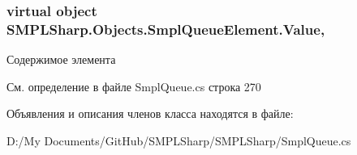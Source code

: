 \hypertarget{class_s_m_p_l_sharp_1_1_objects_1_1_smpl_queue_element_aa16777046bf5b47815ff3c8ccab88407}{
\subsubsection[{Value}]{\setlength{\rightskip}{0pt plus 5cm}virtual object S\-M\-P\-L\-Sharp.\-Objects.\-Smpl\-Queue\-Element.\-Value\hspace{0.3cm}{\ttfamily [get]}, {\ttfamily [set]}}}\label{d3/d48/class_s_m_p_l_sharp_1_1_objects_1_1_smpl_queue_element_aa16777046bf5b47815ff3c8ccab88407}


Содержимое элемента 



См. определение в файле Smpl\-Queue.\-cs строка 270



Объявления и описания членов класса находятся в файле\-:\begin{DoxyCompactItemize}
\item 
D\-:/\-My Documents/\-Git\-Hub/\-S\-M\-P\-L\-Sharp/\-S\-M\-P\-L\-Sharp/Smpl\-Queue.\-cs\end{DoxyCompactItemize}
